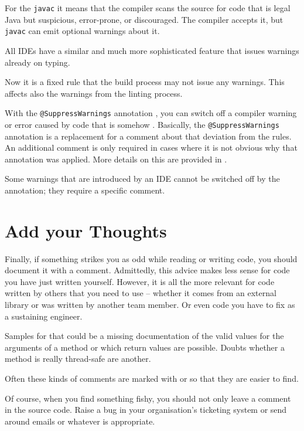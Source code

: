 For the \texttt{javac} it means that the compiler scans the source for code that is legal Java but suspicious, error-prone, or discouraged. The compiler accepts it, but \texttt{javac} can emit optional warnings about it.

All IDEs have a similar and much more sophisticated feature that issues warnings already on typing.

Now it is a fixed rule that the build process may not issue any warnings. This affects also the warnings from the linting process.

With the \lstinline|@SuppressWarnings| annotation \autocite{ORACLE_DOC_SUPPRESSWARNINGS_ANNOTATION}, you can switch off a compiler warning or error caused by code that is somehow . Basically, the \lstinline|@SuppressWarnings| annotation is a replacement for a comment about that deviation from the rules. An additional comment is only required in cases where it is not obvious why that annotation was applied. More details on this are provided in .

Some warnings that are introduced by an IDE cannot be switched off by the annotation; they require a specific comment.


\section{Add your Thoughts}
Finally, if something strikes you as odd while reading or writing code, you should document it with a comment. Admittedly, this advice makes less sense for code you have just written yourself. However, it is all the more relevant for code written by others that you need to use – whether it comes from an external library or was written by another team member. Or even code you have to fix as a sustaining engineer.

Samples for that could be a missing documentation of the valid values for the arguments of a method or which return values are possible. Doubts whether a method is really thread-safe are another.

Often these kinds of comments are marked with  or  so that they are easier to find.

Of course, when you find something fishy, you should not only leave a comment in the source code. Raise a bug in your organisation's ticketing system or send around emails or whatever is appropriate.

